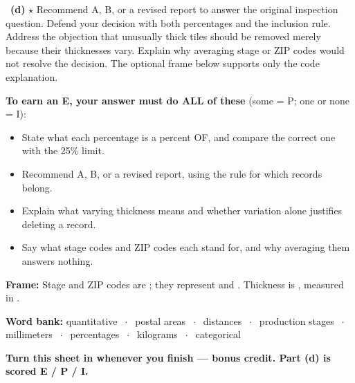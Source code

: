 \documentclass[11pt]{article}
\begin{document}
~\textbf{(d)} $\star$ Recommend A, B, or a revised report to answer the original inspection question. Defend your decision with both percentages and the inclusion rule. Address the objection that unusually thick tiles should be removed merely because their thicknesses vary. Explain why averaging stage or ZIP codes would not resolve the decision. The optional frame below supports only the code explanation.\par
{\small\textbf{To earn an E, your answer must do ALL of these} (some = P; one or none = I):
\begin{itemize}[leftmargin=1.6em,itemsep=0pt,topsep=1pt,parsep=0pt]
  \item[{\setlength{\fboxsep}{0pt}\fbox{\rule{0pt}{0.65em}\hspace{0.65em}}}] State what each percentage is a percent OF, and compare the correct one with the 25\% limit.
  \item[{\setlength{\fboxsep}{0pt}\fbox{\rule{0pt}{0.65em}\hspace{0.65em}}}] Recommend A, B, or a revised report, using the rule for which records belong.
  \item[{\setlength{\fboxsep}{0pt}\fbox{\rule{0pt}{0.65em}\hspace{0.65em}}}] Explain what varying thickness means and whether variation alone justifies deleting a record.
  \item[{\setlength{\fboxsep}{0pt}\fbox{\rule{0pt}{0.65em}\hspace{0.65em}}}] Say what stage codes and ZIP codes each stand for, and why averaging them answers nothing.
\end{itemize}}
\begin{sentenceframebox}[top=3pt,bottom=3pt,before skip=4pt,after skip=4pt]\raggedright\textbf{Frame:} Stage and ZIP codes are ; they represent  and . Thickness is , measured in .\end{sentenceframebox}

\begin{wordbankbox}[top=3pt,bottom=3pt,before skip=4pt,after skip=4pt]\small\raggedright
\textbf{Word bank:} quantitative \ensuremath{\;\cdot\;} postal areas \ensuremath{\;\cdot\;} distances \ensuremath{\;\cdot\;} production stages \ensuremath{\;\cdot\;} millimeters \ensuremath{\;\cdot\;} percentages \ensuremath{\;\cdot\;} kilograms \ensuremath{\;\cdot\;} categorical
\end{wordbankbox}



\textbf{Turn this sheet in whenever you finish --- bonus credit. Part (d) is scored E / P / I.}\par

\twopageguard
\end{document}
